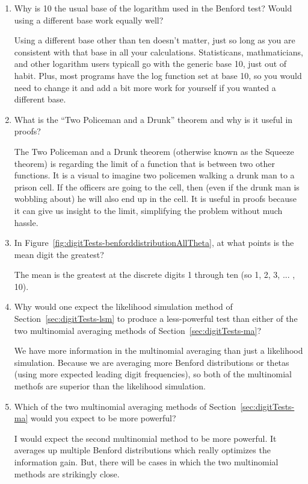 \begin{enumerate}
 \item Why is 10 the usual base of the logarithm used in the Benford test? Would using a different base work equally well?
\begin{solution}
Using a different base other than ten doesn't matter, just so long as you are consistent with that base in all your calculations. Statisticans, mathmaticians, and other logarithm users typicall go with the generic base 10, just out of habit. Plus, most programs have the log function set at base 10, so you would need to change it and add a bit more work for yourself if you wanted a different base. 
\end{solution}

 \item What is the ``Two Policeman and a Drunk'' theorem and why is it useful in proofs?
\begin{solution}
The Two Policeman and a Drunk theorem (otherwise known as the Squeeze theorem) is regarding the limit of a function that is between two other functions. It is a visual to imagine two policemen walking a drunk man to a prison cell. If the officers are going to the cell, then (even if the drunk man is wobbling about) he will also end up in the cell. It is useful in proofs because it can give us insight to the limit, simplifying the problem without much hassle. 
\end{solution}

 \item In Figure~\ref{fig:digitTests-benforddistributionAllTheta}, at what points is the mean digit the greatest?
\begin{solution}
The mean is the greatest at the discrete digits 1 through ten (so 1, 2, 3, ... , 10). 
\end{solution}

 \item Why would one expect the likelihood simulation method of Section~\ref{sec:digitTests-lsm} to produce a less-powerful test than either of the two multinomial averaging methods of Section~\ref{sec:digitTests-ma}?
\begin{solution}
We have more information in the multinomial averaging than just a likelihood simulation. Because we are averaging more Benford distributions or thetas (using more expected leading digit frequencies), so both of the multinomial methofs are superior than the likelihood simulation. 
\end{solution}

 \item Which of the two multinomial averaging methods of Section~\ref{sec:digitTests-ma} would you expect to be more powerful?
\begin{solution}
I would expect the second multinomial method to be more powerful. It averages up multiple Benford distributions which really optimizes the information gain. But, there will be cases in which the two multinomial methods are strikingly close. 
\end{solution}


\end{enumerate}
